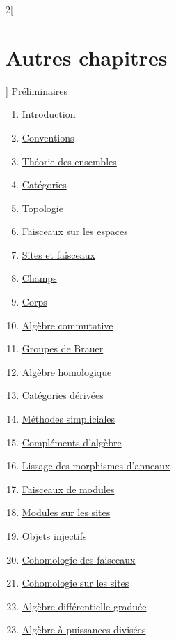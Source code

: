 \begin{multicols}{2}[\section{Autres chapitres}]
\noindent
Préliminaires
\begin{enumerate}
\item \hyperref[introduction-section-phantom]{Introduction}
\item \hyperref[conventions-section-phantom]{Conventions}
\item \hyperref[sets-section-phantom]{Théorie des ensembles}
\item \hyperref[categories-section-phantom]{Catégories}
\item \hyperref[topology-section-phantom]{Topologie}
\item \hyperref[sheaves-section-phantom]{Faisceaux sur les espaces}
\item \hyperref[sites-section-phantom]{Sites et faisceaux}
\item \hyperref[stacks-section-phantom]{Champs}
\item \hyperref[fields-section-phantom]{Corps}
\item \hyperref[algebra-section-phantom]{Algèbre commutative}
\item \hyperref[brauer-section-phantom]{Groupes de Brauer}
\item \hyperref[homology-section-phantom]{Algèbre homologique}
\item \hyperref[derived-section-phantom]{Catégories dérivées}
\item \hyperref[simplicial-section-phantom]{Méthodes simpliciales}
\item \hyperref[more-algebra-section-phantom]{Compléments d'algèbre}
\item \hyperref[smoothing-section-phantom]{Lissage des morphismes d'anneaux}
\item \hyperref[modules-section-phantom]{Faisceaux de modules}
\item \hyperref[sites-modules-section-phantom]{Modules sur les sites}
\item \hyperref[injectives-section-phantom]{Objets injectifs}
\item \hyperref[cohomology-section-phantom]{Cohomologie des faisceaux}
\item \hyperref[sites-cohomology-section-phantom]{Cohomologie sur les sites}
\item \hyperref[dga-section-phantom]{Algèbre différentielle graduée}
\item \hyperref[dpa-section-phantom]{Algèbre à puissances divisées}

\end{enumerate}
\end{multicols}
